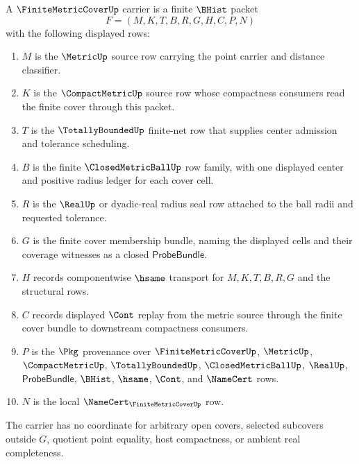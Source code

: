\begin{definition}
\label{def:finite-metric-cover-carrier}
A $\FiniteMetricCoverUp$ carrier is a finite $\BHist$ packet
$$
F=(M,K,T,B,R,G,H,C,P,N)
$$
with the following displayed rows:
\begin{enumerate}
\item $M$ is the $\MetricUp$ source row carrying the point carrier and distance classifier.
\item $K$ is the $\CompactMetricUp$ source row whose compactness consumers read the finite cover through this packet.
\item $T$ is the $\TotallyBoundedUp$ finite-net row that supplies center admission and tolerance scheduling.
\item $B$ is the finite $\ClosedMetricBallUp$ row family, with one displayed center and positive radius ledger for each cover cell.
\item $R$ is the $\RealUp$ or dyadic-real radius seal row attached to the ball radii and requested tolerance.
\item $G$ is the finite cover membership bundle, naming the displayed cells and their coverage witnesses as a closed $\mathsf{ProbeBundle}$.
\item $H$ records componentwise $\hsame$ transport for $M,K,T,B,R,G$ and the structural rows.
\item $C$ records displayed $\Cont$ replay from the metric source through the finite cover bundle to downstream compactness consumers.
\item $P$ is the $\Pkg$ provenance over $\FiniteMetricCoverUp$, $\MetricUp$, $\CompactMetricUp$, $\TotallyBoundedUp$, $\ClosedMetricBallUp$, $\RealUp$, $\mathsf{ProbeBundle}$, $\BHist$, $\hsame$, $\Cont$, and $\NameCert$ rows.
\item $N$ is the local $\NameCert_{\FiniteMetricCoverUp}$ row.
\end{enumerate}
The carrier has no coordinate for arbitrary open covers, selected subcovers outside $G$, quotient point equality, host compactness, or ambient real completeness.
\end{definition}

